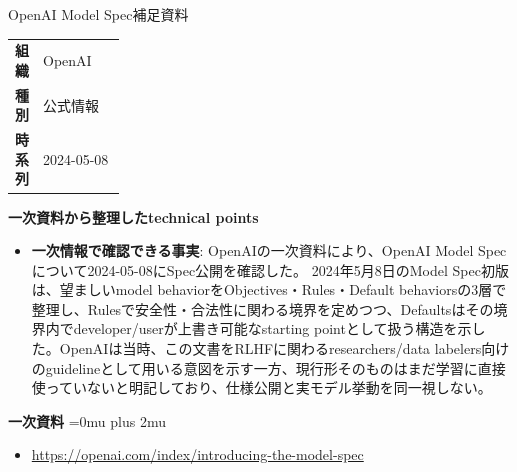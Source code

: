 \Needspace{0.38\textheight}
\begin{technicalnote}{OpenAI Model Spec}{補足資料}
\begingroup
\begin{tabularx}{\linewidth}{@{}>{\bfseries}p{0.22\linewidth}X@{}}
組織 & OpenAI \\
種別 & 公式情報 \\
時系列 & 2024-05-08 \\
\end{tabularx}
\smallskip
\begin{minipage}{\linewidth}
{\bfseries 一次資料から整理したtechnical points}
\begin{itemize}[leftmargin=1.5em,itemsep=0.35em]
\item \textbf{一次情報で確認できる事実}: OpenAIの一次資料により、OpenAI Model Specについて2024-05-08にSpec公開を確認した。 2024年5月8日のModel Spec初版は、望ましいmodel behaviorをObjectives・Rules・Default behaviorsの3層で整理し、Rulesで安全性・合法性に関わる境界を定めつつ、Defaultsはその境界内でdeveloper/userが上書き可能なstarting pointとして扱う構造を示した。OpenAIは当時、この文書をRLHFに関わるresearchers/data labelers向けのguidelineとして用いる意図を示す一方、現行形そのものはまだ学習に直接使っていないと明記しており、仕様公開と実モデル挙動を同一視しない。
\end{itemize}
\begin{minipage}{\linewidth}
\begin{samepage}
{\bfseries 一次資料}
\begingroup\sloppy
\Urlmuskip=0mu plus 2mu\relax
\begin{itemize}[leftmargin=1.5em,itemsep=0.25em]
\item {\scriptsize\url{https://openai.com/index/introducing-the-model-spec}}
\end{itemize}
\endgroup
\end{samepage}
\end{minipage}
\end{minipage}
\endgroup
\end{technicalnote}
\medskip

